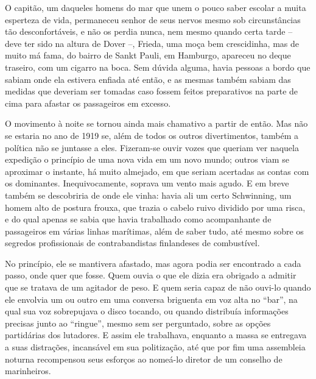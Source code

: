 O capitão, um daqueles homens do mar que unem o pouco saber escolar a
muita esperteza de vida, permaneceu senhor de seus nervos mesmo sob
circunstâncias tão desconfortáveis, e não os perdia nunca, nem mesmo
quando certa tarde -- deve ter sido na altura de Dover --, Frieda, uma
moça bem crescidinha, mas de muito má fama, do bairro de Sankt Pauli, em
Hamburgo, apareceu no deque traseiro, com um cigarro na boca. Sem dúvida
alguma, havia pessoas a bordo que sabiam onde ela estivera enfiada até
então, e as mesmas também sabiam das medidas que deveriam ser tomadas
caso fossem feitos preparativos na parte de cima para afastar os
passageiros em excesso.

O movimento à noite se tornou ainda mais chamativo a partir de então.
Mas não se estaria no ano de 1919 se, além de todos os outros
divertimentos, também a política não se juntasse a eles. Fizeram-se
ouvir vozes que queriam ver naquela expedição o princípio de uma nova
vida em um novo mundo; outros viam se aproximar o instante, há muito
almejado, em que seriam acertadas as contas com os dominantes.
Inequivocamente, soprava um vento mais agudo. E em breve também se
descobriria de onde ele vinha: havia ali um certo Schwinning, um homem
alto de postura frouxa, que trazia o cabelo ruivo dividido por uma
risca, e do qual apenas se sabia que havia trabalhado como acompanhante
de passageiros em várias linhas marítimas, além de saber tudo, até mesmo
sobre os segredos profissionais de contrabandistas finlandeses de
combustível.

No princípio, ele se mantivera afastado, mas agora podia ser encontrado
a cada passo, onde quer que fosse. Quem ouvia o que ele dizia era
obrigado a admitir que se tratava de um agitador de peso. E quem seria
capaz de não ouvi-lo quando ele envolvia um ou outro em uma conversa
briguenta em voz alta no ``bar'', na qual sua voz sobrepujava o disco
tocando, ou quando distribuía informações precisas junto ao ``ringue'',
mesmo sem ser perguntado, sobre as opções partidárias dos lutadores. E
assim ele trabalhava, enquanto a massa se entregava a suas distrações,
incansável em sua politização, até que por fim uma assembleia noturna
recompensou seus esforços ao nomeá-lo diretor de um conselho de
marinheiros.

